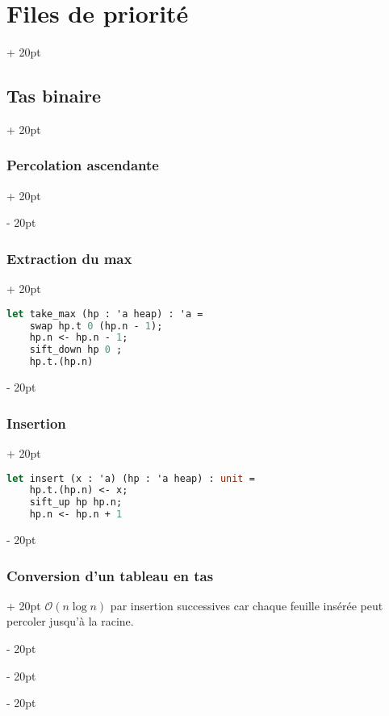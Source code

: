 \documentclass[a4paper, 12pt, twoside]{article}
\newcommand{\ind}[1][20pt]{\advance\leftskip + #1}
\newcommand{\deind}[1][20pt]{\advance\leftskip - #1}
\newenvironment{indt}[2][20pt]{#2 \par \ind[#1]}{\par \deind} %
\begin{document}
\begin{indt}{\section{Files de priorité}}
\begin{indt}{\subsection{Tas binaire}}
            \vspace{12pt}
            
            \begin{indt}{\subsubsection{Percolation ascendante}}
            \end{indt}
            
            \vspace{12pt}
            
            \begin{indt}{\subsubsection{Extraction du max}}
                \begin{lstlisting}[language=Caml, xleftmargin=80pt]
let take_max (hp : 'a heap) : 'a =
    swap hp.t 0 (hp.n - 1);
    hp.n <- hp.n - 1;
    sift_down hp 0 ;
    hp.t.(hp.n)\end{lstlisting}
            \end{indt}
            
            \vspace{12pt}
            
            \begin{indt}{\subsubsection{Insertion}}
                \begin{lstlisting}[language=Caml, xleftmargin=80pt]
let insert (x : 'a) (hp : 'a heap) : unit =
    hp.t.(hp.n) <- x;
    sift_up hp hp.n;
    hp.n <- hp.n + 1\end{lstlisting}
            \end{indt}
            
            \vspace{12pt}
            
            \begin{indt}{\subsubsection{Conversion d'un tableau en tas}}
                $\mathcal O(n\log n)$ par insertion successives car chaque feuille insérée peut percoler jusqu'à la racine.
                

\end{indt}
\end{indt}
\end{indt}
\end{document}

